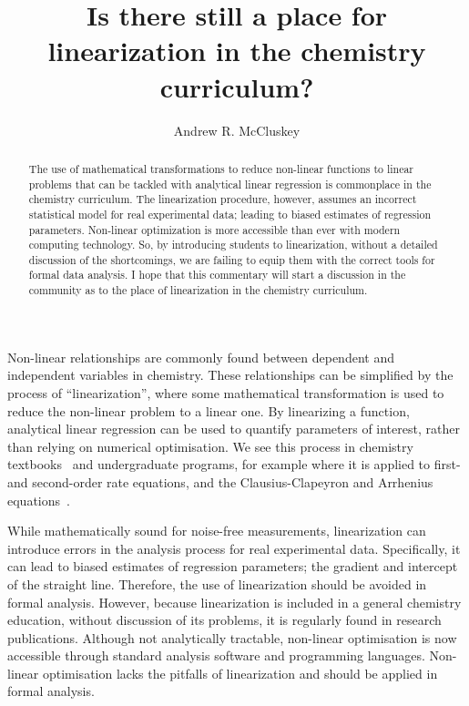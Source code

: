 \documentclass[journal=jceda8,manuscript=article]{achemso}
\author{Andrew R. McCluskey}
\affiliation{European Spallation Source ERIC, Ole Maaløes vej 3, 2200 København N, DK}
\title{Is there still a place for linearization in the chemistry curriculum?}
\begin{document}
\begin{abstract}
    The use of mathematical transformations to reduce non-linear functions to linear problems that can be tackled with analytical linear regression is commonplace in the chemistry curriculum. 
    The linearization procedure, however, assumes an incorrect statistical model for real experimental data; leading to biased estimates of regression parameters. 
    Non-linear optimization is more accessible than ever with modern computing technology. 
    So, by introducing students to linearization, without a detailed discussion of the shortcomings, we are failing to equip them with the correct tools for formal data analysis. 
    I hope that this commentary will start a discussion in the community as to the place of linearization in the chemistry curriculum. 
\end{abstract}

\maketitle 

Non-linear relationships are commonly found between dependent and independent variables in chemistry.
These relationships can be simplified by the process of ``linearization'', where some mathematical transformation is used to reduce the non-linear problem to a linear one. 
By linearizing a function, analytical linear regression can be used to quantify parameters of interest, rather than relying on numerical optimisation. 
We see this process in chemistry textbooks~\cite{monk_math_2010,atkins_physical_2018} and undergraduate programs, for example where it is applied to first- and second-order rate equations, and the Clausius-Clapeyron and Arrhenius equations~\cite{perrin_linear_2017,harper_data_2017,monk_math_2010}.

While mathematically sound for noise-free measurements, linearization can introduce errors in the analysis process for real experimental data. 
Specifically, it can lead to biased estimates of regression parameters; the gradient and intercept of the straight line.
Therefore, the use of linearization should be avoided in formal analysis. 
However, because linearization is included in a general chemistry education, without discussion of its problems, it is regularly found in research publications. 
Although not analytically tractable, non-linear optimisation is now accessible through standard analysis software and programming languages.
Non-linear optimisation lacks the pitfalls of linearization and should be applied in formal analysis.
\end{document}
